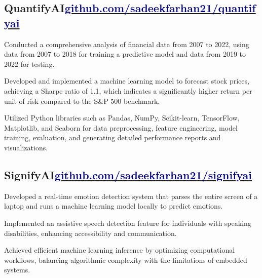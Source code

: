 \documentclass[]{Farhan_Resume_Class}
\begin{document}
\begin{minipage}[t]{0.70\textwidth}
    \subsection{QuantifyAI\hfill \href{https://github.com/SadeekFarhan21/Quantathon/}{\textcolor{darkblue}{\lowercase{github.com/SadeekFarhan21/QuantifyAI}}}}
    \begin{tightemize}     \vspace{10pt}
    \item Conducted a comprehensive analysis of financial data from 2007 to 2022, using data from 2007 to 2018 for training a predictive model and data from 2019 to 2022 for testing.
    \item Developed and implemented a machine learning model to forecast stock prices, achieving a Sharpe ratio of 1.1, which indicates a significantly higher return per unit of risk compared to the S\&P 500 benchmark.
    \item Utilized Python libraries such as Pandas, NumPy, Scikit-learn, TensorFlow, Matplotlib, and Seaborn for data preprocessing, feature engineering, model training, evaluation, and generating detailed performance reports and visualizations.
    \end{tightemize}

    \subsection{SignifyAI\hfill\href{https://github.com/SadeekFarhan21/SignifyAI/}{\textcolor{darkblue}{\lowercase{github.com/SadeekFarhan21/SignifyAI}}}}
    \begin{tightemize}
        \vspace{10pt}
        \item Developed a real-time emotion detection system that parses the entire screen of a laptop and runs a machine learning model locally to predict emotions.
        \item Implemented an assistive speech detection feature for individuals with speaking disabilities, enhancing accessibility and communication.
        \item Achieved efficient machine learning inference by optimizing computational workflows, balancing algorithmic complexity with the limitations of embedded systems.
    \end{tightemize}


\end{minipage}
\end{document}
